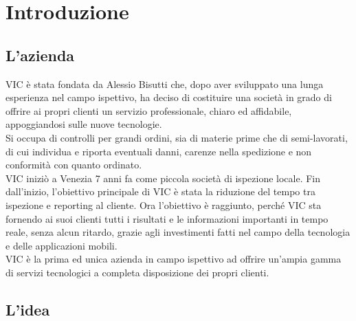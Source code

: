 
\chapter{Introduzione}
\label{cap:introduzione}
\section{L'azienda}

VIC è stata fondata da Alessio Bisutti che, dopo aver sviluppato una lunga esperienza nel campo ispettivo, ha deciso di costituire una società in grado di offrire ai propri clienti un servizio professionale, chiaro ed affidabile, appoggiandosi sulle nuove tecnologie.\\
Si occupa di controlli per grandi ordini, sia di materie prime che di semi-lavorati, di cui individua e riporta eventuali danni, carenze nella spedizione e non conformità con quanto ordinato.\\
VIC iniziò a Venezia 7 anni fa come piccola società di ispezione locale. Fin dall'inizio, l'obiettivo principale di VIC è stata la riduzione del tempo tra ispezione e reporting al cliente. Ora l'obiettivo è raggiunto, perché VIC sta fornendo ai suoi clienti tutti i risultati e le informazioni importanti in tempo reale, senza alcun ritardo, grazie agli investimenti fatti nel campo della tecnologia e delle applicazioni mobili.\\
VIC è la prima ed unica azienda in campo ispettivo ad offrire un'ampia gamma di servizi tecnologici a completa disposizione dei propri clienti. 

\section{L'idea}

